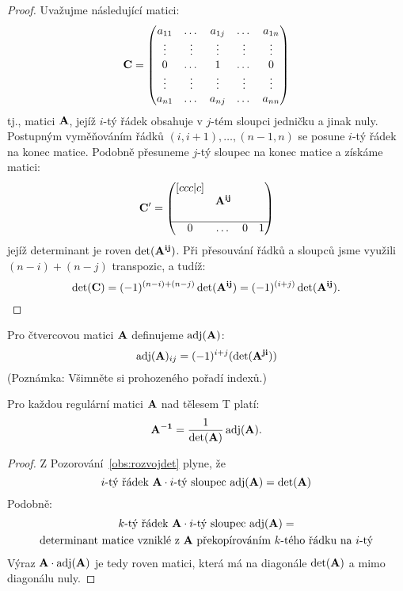 \begin{proof}
    Uvažujme následující matici:
    $$\mathbf{C} = \begin{pmatrix}
        a_{11} &\dots  &a_{1j} &\dots  &a_{1n} \\
        \vdots &\vdots &\vdots &\vdots &\vdots \\
        0      &\dots  &1      &\dots  &0 \\
        \vdots &\vdots &\vdots &\vdots &\vdots\\
        a_{n1} &\dots  &a_{nj} &\dots  &a_{nn}
      \end{pmatrix}$$
    tj., matici $\mathbf{A}$, jejíž $i$-tý řádek obsahuje v $j$-tém sloupci jedničku
    a jinak nuly. Postupným vyměňováním 
    řádků $(i,i+1), \dots, (n-1, n)$ se posune $i$-tý řádek na konec matice. 
    Podobně přesuneme $j$-tý sloupec na konec matice a získáme matici:
    $$\mathbf{C'} = \begin{pmatrix}[ccc|c]
          & & & \\
          &\mathbf{A^{ij}} & & \\
          &  & & \\
        \hline 
        0 &\dots  &0      &1  
      \end{pmatrix}$$
    jejíž determinant je roven $\det(\mathbf{A^{ij}})$. Při přesouvání řádků
    a sloupců jsme využili $(n-i) + (n-j)$ transpozic, a tudíž:
    $$\det(\mathbf{C}) = (-1)^{(n-i) + (n-j)} \det(\mathbf{A^{ij}}) = 
    (-1)^{(i+j)}\det(\mathbf{A^{ij}}).$$
\end{proof}


\begin{definition}
    Pro čtvercovou matici $\mathbf{A}$ definujeme 
    $\mathop{\mathrm{adj}}(\mathbf{A})$:
    $$\mathop{\mathrm{adj}}(\mathbf{A})_{ij} = (-1)^{i+j} (\det(\mathbf{A^{ji}}))$$
    (Poznámka: Všimněte si prohozeného pořadí indexů.)
\end{definition}

\begin{theorem}
    Pro každou regulární matici $\mathbf{A}$ nad tělesem T platí:
    $$ \mathbf{A^{-1}} = \frac{1}{\det(\mathbf{A})} \mathop{\mathrm{adj}}(\mathbf{A}).$$
\end{theorem}

\begin{proof}
    Z Pozorování~\ref{obs:rozvojdet} plyne, že
    $$\text{$i$-tý řádek $\mathbf{A}\cdot i$-tý sloupec $\mathop{\mathrm{adj}}(\mathbf{A}) = \det(\mathbf{A})$}$$
    Podobně:
    \begin{multline*}
        \text{$k$-tý řádek $\mathbf{A}\cdot i$-tý sloupec $\mathop{\mathrm{adj}}(\mathbf{A}) = $} \\ 
        \text{determinant matice vzniklé z $\mathbf{A}$ překopírováním $k$-tého 
        řádku na $i$-tý}
    \end{multline*}
    Výraz $\mathbf{A} \cdot \mathop{\mathrm{adj}}(\mathbf{A})$ je tedy roven matici, která má na diagonále 
    $\det(\mathbf{A})$ a mimo diagonálu nuly.
\end{proof}

